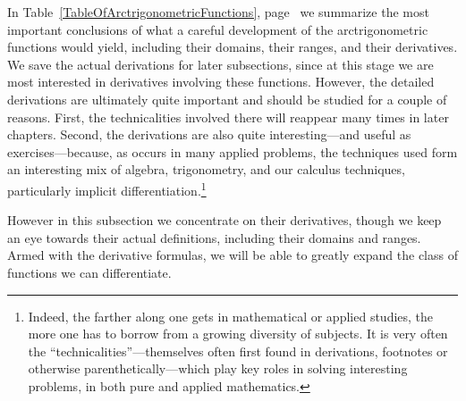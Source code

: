 In Table~\ref{TableOfArctrigonometricFunctions}, 
page~\pageref{TableOfArctrigonometricFunctions}
we summarize the most important conclusions of what 
a careful development of the 
arctrigonometric functions would yield, including their domains,
their ranges, and their derivatives.
We save the actual derivations for later subsections, since
at this stage we are most interested in derivatives involving
these functions.  However, the detailed derivations are ultimately 
quite important and
should be studied for a couple of reasons.
First, the technicalities involved there will
reappear many times in later chapters.  
Second, the derivations
are also quite interesting---and useful as exercises---because, 
as occurs in many applied problems, the techniques used form an 
interesting mix of algebra, trigonometry, and
our calculus techniques, particularly implicit 
differentiation.\footnote{%
Indeed, the farther along one gets in mathematical or applied studies,
the more one has to borrow from a growing diversity
of subjects.
It is very often the ``technicalities''---themselves often first
found in derivations,
footnotes or otherwise parenthetically---which play key roles
in solving interesting problems, in both pure and applied mathematics.
}




However in this subsection
we concentrate on their derivatives, though
we keep 
an eye towards their actual definitions, including their domains and
ranges.  Armed with the derivative formulas, we will be able to 
greatly expand the class of functions we can differentiate.

